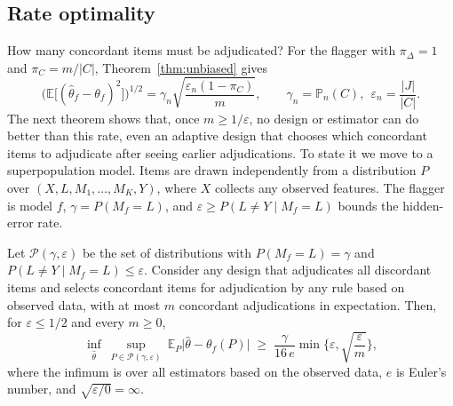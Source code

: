 \documentclass[twoside,11pt]{article}
\newcommand{\Pn}{\mathbb{P}_n}
\newcommand{\E}{\mathbb{E}}
\newcommand{\1}{\mathbf{1}}
\newcommand{\Dset}{\Delta}
\newcommand{\Cset}{C}
\begin{document}
\subsection{Rate optimality}
\label{sec:lower}

How many concordant items must be adjudicated? For the flagger with $\pi_\Dset=1$ and $\pi_\Cset=m/|\Cset|$, Theorem~\ref{thm:unbiased} gives
\begin{equation}\label{eq:upper}
\Big(\E\big[(\hat\theta_f-\theta_f)^2\big]\Big)^{1/2}=\gamma_n\sqrt{\frac{\varepsilon_n(1-\pi_\Cset)}{m}},
\qquad \gamma_n=\Pn(\Cset),\ \ \varepsilon_n=\frac{|J|}{|\Cset|}.
\end{equation}
The next theorem shows that, once $m\ge1/\varepsilon$, no design or estimator can do better than this rate, even an adaptive design that chooses which concordant items to adjudicate after seeing earlier adjudications. To state it we move to a superpopulation model. Items are drawn independently from a distribution $P$ over $(X,L,M_1,\dots,M_K,Y)$, where $X$ collects any observed features. The flagger is model $f$, $\gamma=P(M_f=L)$, and $\varepsilon\ge P(L\neq Y\mid M_f=L)$ bounds the hidden-error rate.

\begin{theorem}\label{thm:lower}
Let $\mathcal P(\gamma,\varepsilon)$ be the set of distributions with $P(M_f=L)=\gamma$ and $P(L\ne Y\mid M_f=L)\le\varepsilon$. Consider any design that adjudicates all discordant items and selects concordant items for adjudication by any rule based on observed data, with at most $m$ concordant adjudications in expectation. Then, for $\varepsilon\le1/2$ and every $m\ge0$,
\[
\inf_{\hat\theta}\ \sup_{P\in\mathcal P(\gamma,\varepsilon)}\ \E_P\big|\hat\theta-\theta_f(P)\big|\;\ge\;\frac{\gamma}{16\,e}\min\Big\{\varepsilon,\sqrt{\frac{\varepsilon}{m}}\Big\},
\]
where the infimum is over all estimators based on the observed data, $e$ is Euler's number, and $\sqrt{\varepsilon/0}=\infty$.
\end{theorem}
\end{document}
